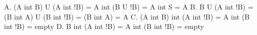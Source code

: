 \documentclass{article}
\begin{document}
    A. (A int B) U (A int !B) = A int (B U !B) = A int S = A
    B. B U (A int !B) = (B int A) U (B int !B) = (B int A) = A
    C. (A int B) int (A int !B) = A int (B int !B) = empty
    D. B int (A int !B) = A int (B int !B) = empty
\end{document}
